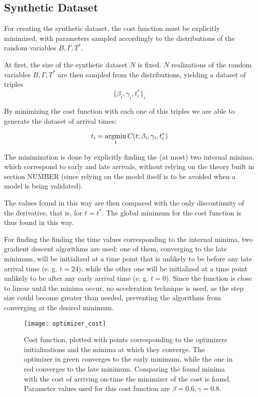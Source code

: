 \subsection{Synthetic Dataset}

For creating the synthetic dataset,
the cost function must be explicitly minimized,
with parameters sampled accordingly to the distributions of the random variables \(B, \Gamma, T^*\).

At first, the size of the synthetic dataset \(N\) is fixed.
\(N\) realizations of the random variables \(B, \Gamma, T^*\) are then sampled from the distributions,
yielding a dataset of triples
\begin{equation*}
  \{\beta_i, \gamma_i, t^*_i\}_i
\end{equation*}

By minimizing the cost function with each one of this triples we are able to generate the dataset of arrival times:

\begin{equation*}
  t_i = \operatorname*{argmin}_t C(t; \beta_i, \gamma_i, t^*_i)
\end{equation*}

The minimization is done by explicitly finding the (at most) two internal minima,
which correspond to early and late arrivals,
without relying on the theory built in section NUMBER
(since relying on the model itself is to be avoided when a model is being validated).

The values found in this way are then compared with the only discontinuity of the derivative,
that is, for \(t = t^*\).
The global minimum for the cost function is thus found in this way.

For finding the finding the time values corresponding to the internal minima,
two gradient descent algorithms are used:
one of them, converging to the late minimum,
will be initialized at a time point that is unlikely to be before any late arrival time (e. g. \(t = 24\)),
while the other one will be initialized at a time point unlikely to be after any early arrival time (e. g. \(t = 0\)).
Since the function is close to linear until the minima occur,
no acceleration technique is used,
as the step size could become greater than needed,
preventing the algorithms from converging at the desired minimum.

\begin{figure}
  \centering
  \texttt{[image: optimizer\_cost]}
  \caption{
    Cost function,
    plotted with points corresponding to the optimizers initializations and the minima at which they converge.
    The optimizer in green converges to the early minimum,
    while the one in red converges to the late minimum.
    Comparing the found minima with the cost of arriving on-time the minimizer of the cost is found.
    Parameter values used for this cost function are \(\beta = 0.6, \gamma = 0.8\).
  }
  \label{fig:optimizer-cost}
\end{figure}

